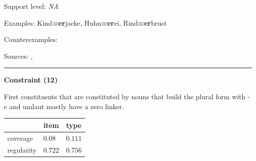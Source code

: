 \vspace{-1.35em}

\noindent
Support level: \textit{NA}

\vspace{0.3em}

\noindent
Examples: Kind\textbf{=er}jacke, Huhn\textbf{=er}ei, Rind\textbf{=er}brust

\noindent
Counterexamples: 

\vspace{0.3em}

\noindent
Sources: \citet[229]{eisenberg_2013}, \citet[98]{ortner_mueller-bollhagen_1991}

\vspace{0.35em}
\hrule




\vspace{0.4em}

\begin{center}
\textbf{Constraint (12)}
\end{center}

\noindent
First constituents that are constituted by nouns that build the plural form with -e and umlaut mostly have a zero linker.
\vspace{0.5em}


\vspace{-0.25em}

\begin{table}[!ht]
\begin{center}
\setlength{\extrarowheight}{1pt}
\begin{tabularx}{\columnwidth}{|X|X|X|}
\hline
 & item & type \\
\hline
 coverage & $0.08$ & $0.111$ \\
\hline
 regularity & $0.722$ & $0.756$ \\
\hline
\end{tabularx}
\end{center}
\end{table}

